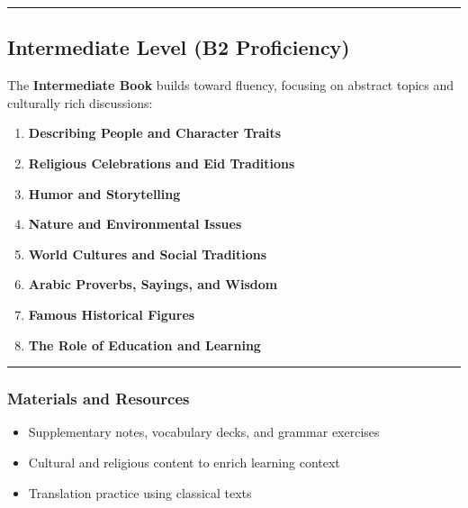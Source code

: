 \documentclass[
  a4paper,
  DIV=11,
  numbers=noendperiod]{scrartcl}
\providecommand{\tightlist}{%
  \setlength{\itemsep}{0pt}\setlength{\parskip}{0pt}}
\begin{document}
\begin{center}\rule{0.5\linewidth}{0.5pt}\end{center}

\subsection{Intermediate Level (B2
Proficiency)}\label{intermediate-level-b2-proficiency}

The \textbf{Intermediate Book} builds toward fluency, focusing on
abstract topics and culturally rich discussions:

\begin{enumerate}
\def\labelenumi{\arabic{enumi}.}
\tightlist
\item
  \textbf{Describing People and Character Traits}\\
\item
  \textbf{Religious Celebrations and Eid Traditions}\\
\item
  \textbf{Humor and Storytelling}\\
\item
  \textbf{Nature and Environmental Issues}\\
\item
  \textbf{World Cultures and Social Traditions}\\
\item
  \textbf{Arabic Proverbs, Sayings, and Wisdom}\\
\item
  \textbf{Famous Historical Figures}\\
\item
  \textbf{The Role of Education and Learning}
\end{enumerate}

\begin{center}\rule{0.5\linewidth}{0.5pt}\end{center}

\subsubsection{Materials and Resources}\label{materials-and-resources}

\begin{itemize}
\tightlist
\item
  Supplementary notes, vocabulary decks, and grammar exercises\\
\item
  Cultural and religious content to enrich learning context
\item
  Translation practice using classical texts
\end{itemize}
\end{document}
